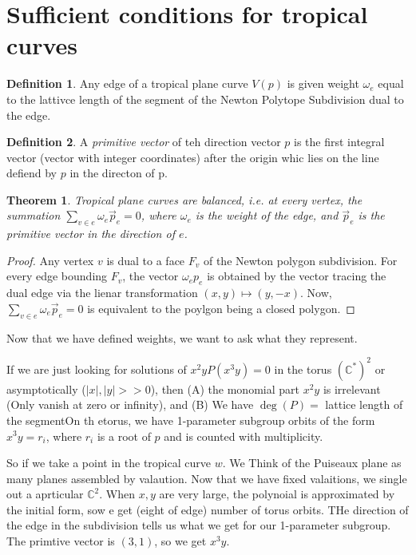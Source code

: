\documentclass[12pt]{memoir}
\newtheorem{prototheorem}{Theorem}[section]
\newenvironment{theorem}
   {\begin{prototheorem}}
   {\end{prototheorem}}
\theoremstyle{definition}
\newtheorem{protodefinition}{Definition}[section]
\newenvironment{define}
   {\begin{protodefinition}}
   {\end{protodefinition}}
\def\CC{{\mathbb C}}
\begin{document}

\section{Sufficient conditions for tropical curves}

\begin{define}
    Any edge of a tropical plane curve $V(p)$ is given weight $\omega_e$ equal to the lattivce length of the segment of the Newton Polytope Subdivision dual to the edge.
\end{define}

\begin{define}
    A \emph{primitive vector} of teh direction vector $p$ is the first integral vector (vector with integer coordinates) after the origin whic lies on the line defiend by $p$ in the directon of p.
\end{define}


\begin{theorem}
    Tropical plane curves are balanced, i.e. at every vertex, the summation $\sum\limits_{v \in e}\omega_e \overrightarrow{p}_e=0$, where $\omega_e$ is the weight of the edge, and $\overrightarrow{p}_e$ is the primitive vector in the direction of $e$.
\end{theorem}

\begin{proof}
    Any vertex $v$ is dual to a face $F_v$ of the Newton polygon subdivision. For every edge bounding $F_v$, the vector $\omega_e p_e$ is obtained by the vector tracing the dual edge via the lienar transformation $(x,y)\mapsto (y,-x)$. Now,  $\sum\limits_{v \in e}\omega_e \overrightarrow{p}_e=0$ is equivalent to the poylgon being a closed polygon.
\end{proof}


Now that we have defined weights, we want to ask what they represent.


If we are just looking for solutions of $x^2yP(x^3y)=0$ in the torus $(\CC^*)^2$ or asymptotically ($|x|,|y|>>0$), then (A) the monomial part $x^2y$ is irrelevant (Only vanish at zero or infinity), and (B) We have $\deg(P) =$ lattice length of the segmentOn th etorus, we have 1-parameter subgroup orbits of the form $x^3y=r_i$, where $r_i$ is a root of $p$ and is counted with multiplicity.


So if we take a point in the tropical curve $w$. We Think of the Puiseaux plane as many planes assembled by valaution. Now that we have fixed valaitions, we single out a aprticular $\CC^2$. When $x,y$ are very large, the polynoial is approximated by the initial form, sow e get (eight of edge) number of torus orbits. THe direction of the edge in the subdivision tells us what we get for our 1-parameter subgroup. The primtive vector is $(3,1)$, so we get $x^3y$.
\end{document}
